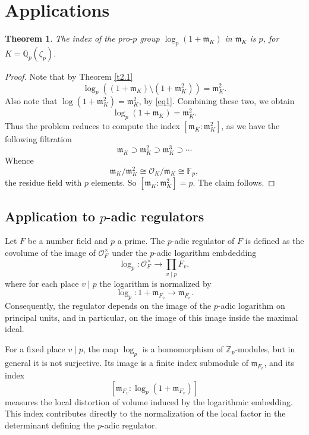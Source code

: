\documentclass[12pt,reqno]{amsart}
\numberwithin{figure}{section}
\theoremstyle{plain}
\newtheorem{thm}{Theorem}[section]
\theoremstyle{definition}
\numberwithin{equation}{section}
\begin{document}
\section{Applications}
\begin{thm} \label{c211}
    The index of the pro-$p$ group $\log_p(1+\mathfrak{m}_K)$ in $\mathfrak{m}_K$ is $p$, for $K=\mathbb{Q}_p(\zeta_p)$.
\end{thm}

\begin{proof}
    Note that by Theorem \ref{t2.1}
    \[ \log_p\left((1+\mathfrak{m}_K) \setminus (1+\mathfrak{m}_K^2) \right)=\mathfrak{m}_K^2. \]
    Also note that $\log(1+\mathfrak{m}_K^2)=\mathfrak{m}_K^2$, by \eqref{eq1}. 
Combining these two, we obtain
    \[ \log_p(1+\mathfrak{m}_K)=\mathfrak{m}_K^2. \]
    Thus the problem reduces to compute the index $[\mathfrak{m}_K: \mathfrak{m}_K^2]$, as we have the following filtration
    \[\mathfrak{m}_K \supset \mathfrak{m}_K^2 \supset \mathfrak{m}_K^3 \supset \cdots\]
    Whence
    \[\mathfrak{m}_K/\mathfrak{m}_K^2 \cong \mathcal{O}_K/\mathfrak{m}_K \cong \mathbb{F}_p, \]
    the residue field with $p$ elements. So $[\mathfrak{m}_K : \mathfrak{m}_K^2]=p$. The claim follows.
\end{proof}


\subsection{Application to $p$-adic regulators}

Let $F$ be a number field and $p$ a prime. The $p$-adic regulator of $F$ is defined as the covolume of the image of $\mathcal{O}_F^{\times}$ under the $p$-adic logarithm embdedding
\[ \log_p: \mathcal{O}_F^{\times} \longrightarrow \prod_{v \mid p} F_v, \]
where for each place $v \mid p$ the logarithm is normalized by
\[ \log_p: 1+\mathfrak{m}_{F_v} \longrightarrow \mathfrak{m}_{F_v}. \]
Consequently, the regulator depends on the image of the $p$-adic logarithm on principal units, and in particular, on the image of this image inside the maximal ideal. 

For a fixed place $v \mid p$, the map $\log_p$ is a homomorphism of $\mathbb{Z}_p$-modules, but in general it is not surjective. Its image is a finite index submodule of $\mathfrak{m}_{F_v}$, and its index
\[[\mathfrak{m}_{F_v}: \log_p(1+\mathfrak{m}_{F_v})]\]
measures the local distortion of volume induced by the logarithmic embedding. This index contributes directly to the normalization of the local factor in the determinant defining the $p$-adic regulator.
\end{document}

